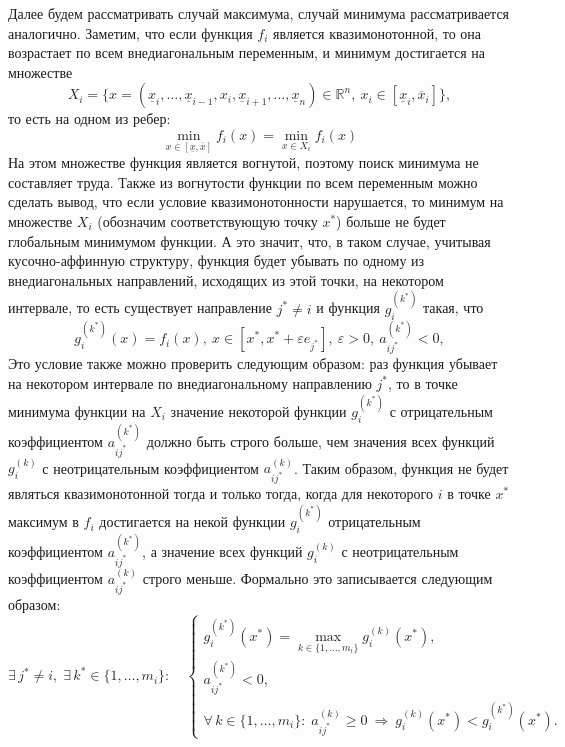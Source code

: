 \documentclass{article}
\renewcommand{\ge}{\geqslant}
\theoremstyle{definition}
\begin{document}
Далее будем рассматривать случай максимума, случай минимума рассматривается аналогично. Заметим, что если функция \(f_i\) является квазимонотонной, то она возрастает по всем внедиагональным переменным, и минимум достигается на множестве 
\[
	X_i = \{x = (\underline{x}_i, \dots, \underline{x}_{i-1}, x_i, \underline{x}_{i+1}, \dots, \underline{x}_n) \in \mathbb{R}^n,\ x_i \in [\underline{x}_i, \overline{x}_i]\},
\]
то есть на одном из ребер:
\[
	\min_{x \in [\underline{x}, \overline{x}]} f_i(x) = \min_{x \in X_i} f_i(x)
\]
На этом множестве функция является вогнутой, поэтому поиск минимума не составляет труда. Также из вогнутости функции по всем переменным можно сделать вывод, что если условие квазимонотонности нарушается, то минимум на множестве \(X_i\) (обозначим соответствующую точку \(x^*\)) больше не будет глобальным минимумом функции. А это значит, что, в таком случае, учитывая кусочно-аффинную структуру, функция будет убывать по одному из внедиагональных направлений, исходящих из этой точки, на некотором интервале, то есть существует направление \(j^* \neq i\) и функция \(g_i^{(k^*)}\) такая, что
\[
	g_i^{(k^*)}(x) = f_i(x),\ x \in [x^*,x^* + \varepsilon e_{j^*}],\ \varepsilon > 0,\ a_{ij^*}^{(k^*)} < 0,
\]
Это условие также можно проверить следующим образом: раз функция убывает на некотором интервале по внедиагональному направлению \(j^*\), то в точке минимума функции на \(X_i\) значение некоторой функции \(g_i^{(k^*)}\) с отрицательным коэффициентом \(a^{(k^*)}_{ij^*}\) должно быть строго больше, чем значения всех функций \(g_i^{(k)}\) с неотрицательным коэффициентом \(a^{(k)}_{ij^*}\). Таким образом, функция не будет являться квазимонотонной тогда и только тогда, когда для некоторого \(i\) в точке \(x^*\) максимум в \(f_i\) достигается на некой функции \(g_i^{(k^*)}\) отрицательным коэффициентом \(a^{(k^*)}_{ij^*}\), а значение всех функций \(g_i^{(k)}\) с неотрицательным коэффициентом \(a^{(k)}_{ij^*}\) строго меньше. Формально это записывается следующим образом:
\begin{equation} \label{bs}
	\exists\, j^* \neq i, \; \exists\, k^* \in \{1,\dots,m_i\} : \quad
	\begin{cases}
		g_i^{(k^*)}(x^*) = \max\limits_{k \in \{1,\dots,m_i\}} g_i^{(k)}(x^*), \\[6pt]
		a_{ij^*}^{(k^*)} < 0, \\[6pt]
		\forall\, k \in \{1,\dots,m_i\} : \; a_{ij^*}^{(k)} \ge 0 \ \Longrightarrow\ 
		g_i^{(k)}(x^*) < g_i^{(k^*)}(x^*).
	\end{cases}
\end{equation}
\end{document}

